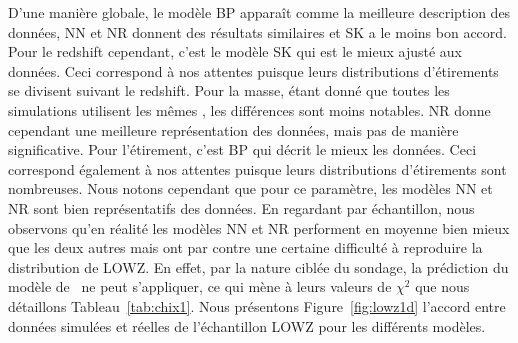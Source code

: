 \documentclass[../main/main.tex]{subfiles}
\begin{document}
D'une manière globale, le modèle BP apparaît comme la meilleure description des
données, NN et NR donnent des résultats similaires et SK a le moins bon accord.
Pour le redshift cependant, c'est le modèle SK qui est le mieux ajusté aux
données. Ceci correspond à nos attentes puisque leurs distributions
d'étirements se divisent suivant le redshift. Pour la masse, étant donné que
toutes les simulations utilisent les mêmes \wgtmap, les différences sont moins
notables. NR donne cependant une meilleure représentation des données, mais pas
de manière significative. Pour l'étirement, c'est BP qui décrit le mieux les
données. Ceci correspond également à nos attentes puisque leurs distributions
d'étirements sont nombreuses. Nous notons cependant que pour ce paramètre, les
modèles NN et NR sont bien représentatifs des données. En regardant par
échantillon, nous observons qu'en réalité les modèles NN et NR performent en
moyenne bien mieux que les deux autres mais ont par contre une certaine
difficulté à reproduire la distribution de LOWZ. En effet, par la nature ciblée
du sondage, la prédiction du modèle de~ ne peut
s'appliquer, ce qui mène à leurs valeurs de $\chi^2$ que nous détaillons
Tableau~\ref{tab:chix1}. Nous présentons Figure~\ref{fig:lowz1d} l'accord entre
données simulées et réelles de l'échantillon LOWZ pour les différents modèles.
\end{document}
